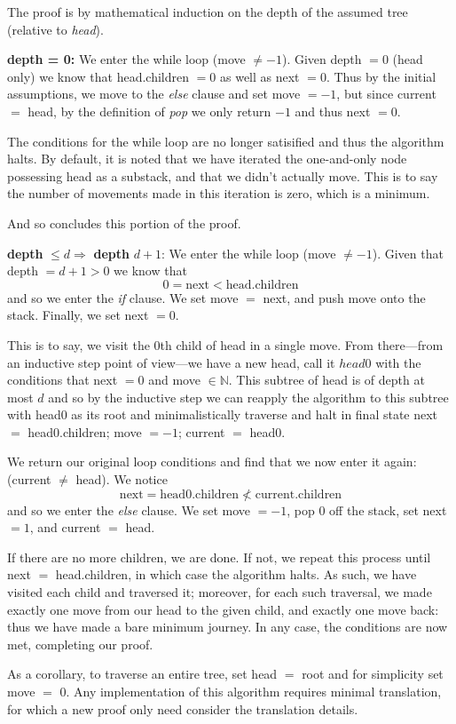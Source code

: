 \documentclass[twoside]{article}
\newenvironment{proof}[1][Proof]{\begin{trivlist}
\item[\hskip \labelsep {\bfseries #1}]}{\end{trivlist}}
\newcommand{\qed}{\nobreak \ifvmode \relax \else
      \ifdim\lastskip<1.5em \hskip-\lastskip
      \hskip1.5em plus0em minus0.5em \fi \nobreak
      \vrule height0.5em width0.5em depth0.25em\fi}
\begin{document}
\begin{proof} The proof is by mathematical induction on the depth of the assumed tree (relative to \emph{head}).

{\bfseries depth = 0:} We enter the while loop (move $ \neq -1 $). Given depth $ = 0 $ (head only) we know that
head.children $ = 0 $ as well as next $ = 0 $. Thus by the initial assumptions, we move to the \emph{else} clause
and set move $ = -1 $, but since current $ = $ head, by the definition of \emph{pop} we only return $ -1 $
and thus next $ = 0 $.

The conditions for the while loop are no longer satisified and thus the algorithm halts. By default, it is noted
that we have iterated the one-and-only node possessing head as a substack, and that we didn’t actually move. This
is to say the number of movements made in this iteration is zero, which is a minimum.

And so concludes this portion of the proof.

{\bfseries depth} $ \leq d\Longrightarrow $ {\bfseries depth }$ d + 1 $: We enter the while loop (move $ \neq -1 $).
Given that depth $ = d + 1 > 0 $ we know that
$$ 0 = \mbox{next} < \mbox{head.children} $$
and so we enter the \emph{if} clause. We set move $ = $ next, and push move onto the stack. Finally, we set next $ = 0 $.

This is to say, we visit the $ 0 $th child of head in a single move. From there---from an inductive step point
of view---we have a new head, call it $ head0 $ with the conditions that next $ = 0 $ and move $ \in\mathbb{N} $.
This subtree of head is of depth at most $ d $ and so by the inductive step we can reapply the algorithm to this
subtree with head0 as its root and minimalistically traverse and halt in final state next $ = $ head0.children;
move $ = -1 $; current $ = $ head0.

We return our original loop conditions and find that we now enter it again: (current $ \neq $ head). We notice
$$ \mbox{next} = \mbox{head0.children} \not < \mbox{current.children} $$
and so we enter the \emph{else} clause. We set move $ = -1 $, pop $ 0 $ off the stack, set next $ = 1 $, and current $ = $ head.

If there are no more children, we are done. If not, we repeat this process until next $ = $ head.children, in which
case the algorithm halts. As such, we have visited each child and traversed it; moreover, for each such traversal, we
made exactly one move from our head to the given child, and exactly one move back: thus we have made a bare minimum journey.
In any case, the conditions are now met, completing our proof. \qed

\end{proof}

As a corollary, to traverse an entire tree, set head $ = $ root and for simplicity set move $ = $ 0. Any implementation
of this algorithm requires minimal translation, for which a new proof only need consider the translation details.
\end{document}
